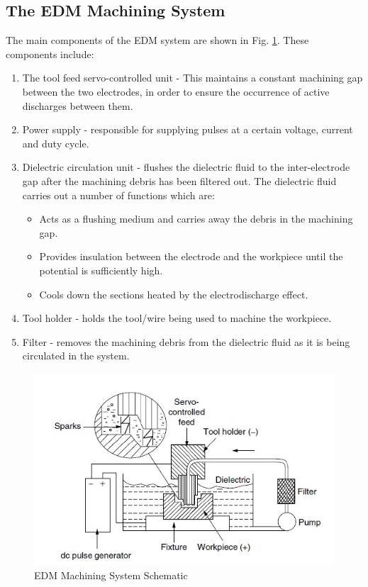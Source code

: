\subsection{The EDM Machining System}
The main components of the EDM system are shown in Fig. \ref{fig:edm}. These components include:
\begin{enumerate}
	\item The tool feed servo-controlled unit - This maintains a constant machining gap between the two electrodes, in order to ensure the occurrence of active discharges between them.
	\item Power supply - responsible for  supplying pulses at a certain voltage, current and duty cycle.
	\item Dielectric circulation unit - flushes the dielectric fluid to the inter-electrode gap after the machining debris has been filtered out. The dielectric fluid carries out a number of functions which are:
	\begin{itemize}
		\item Acts as a flushing medium and carries away the debris in the machining gap.
		\item Provides insulation between the electrode and the workpiece until the potential is sufficiently high.
		\item Cools down the sections heated by the electrodischarge effect.
	\end{itemize}
	\item Tool holder - holds the tool/wire being used to machine the workpiece.
	\item Filter - removes the machining debris from the dielectric fluid as it is being circulated in the system.
\end{enumerate}
\begin{figure}[h!]
	\centering
	\includegraphics[width=0.7\linewidth]{Figures/edm}
	\caption[EDM Machining System]{EDM Machining System Schematic\cite{classnotes}}
	\label{fig:edm}
\end{figure}
